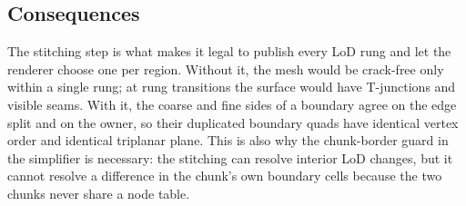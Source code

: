\subsection{Consequences}

The stitching step is what makes it legal to publish every LoD rung and let
the renderer choose one per region.  Without it, the mesh would be
crack-free only within a single rung; at rung transitions the surface would
have T-junctions and visible seams.  With it, the coarse and fine sides of
a boundary agree on the edge split and on the owner, so their duplicated
boundary quads have identical vertex order and identical triplanar plane.
This is also why the chunk-border guard in the simplifier is necessary:
the stitching can resolve interior LoD changes, but it cannot resolve a
difference in the chunk's own boundary cells because the two chunks never
share a node table.
